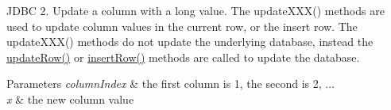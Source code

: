 J\+D\+BC 2. Update a column with a long value. The update\+X\+X\+X() methods are used to update column values in the current row, or the insert row. The update\+X\+X\+X() methods do not update the underlying database, instead the \mbox{\hyperlink{classcom_1_1mysql_1_1jdbc_1_1_updatable_result_set_a919969ba4b3c7cbc7b18605e9f31a746}{update\+Row()}} or \mbox{\hyperlink{classcom_1_1mysql_1_1jdbc_1_1_updatable_result_set_aef041f8d9d0778083716fc26652648fa}{insert\+Row()}} methods are called to update the database.


\begin{DoxyParams}{Parameters}
{\em column\+Index} & the first column is 1, the second is 2, ... \\
\hline
{\em x} & the new column value\\
\hline
\end{DoxyParams}

